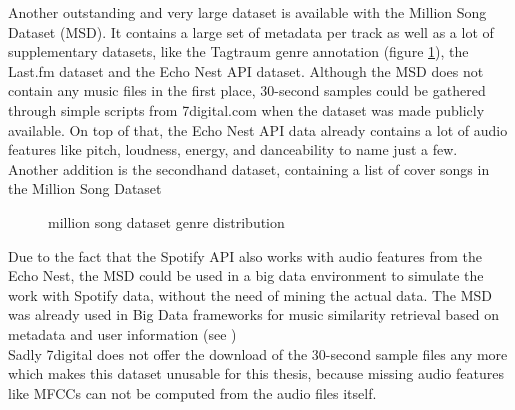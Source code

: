 Another outstanding and very large dataset is available with the Million Song Dataset (MSD)\cite{msd1}. 
It contains a large set of metadata per track as well as a lot of supplementary datasets, like the Tagtraum genre annotation (figure \ref{msddist})\cite{msd5}, the Last.fm dataset\cite{msd2} and the Echo Nest API dataset\cite{msd3}. Although the MSD does not contain any music files in the first place, 30-second samples could be gathered through simple scripts from 7digital.com when the dataset was made publicly available. On top of that, the Echo Nest API data already contains a lot of audio features like pitch, loudness, energy, and danceability to name just a few.\\
Another addition is the secondhand dataset, containing a list of cover songs in the Million Song Dataset\cite{msd6}
\begin{figure}[thpb]
	\centering
	\caption{million song dataset genre distribution}
	\label{msddist}
\end{figure}
\FloatBarrier
Due to the fact that the Spotify API\cite{spotifyapi1} also works with audio features from the Echo Nest\cite{echonest1}, the MSD could be used in a big data environment to simulate the work with Spotify data, without the need of mining the actual data. The MSD was already used in Big Data frameworks for music similarity retrieval based on metadata and user information (see \cite{msd4})\\
Sadly 7digital does not offer the download of the 30-second sample files any more which makes this dataset unusable for this thesis, because missing audio features like MFCCs can not be computed from the audio files itself. 
